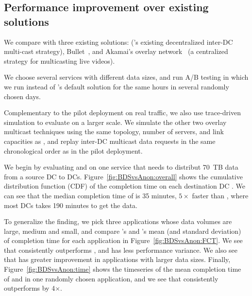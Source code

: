 \subsection{Performance improvement over existing solutions}
\label{subsec:evaluation:centralized}


We compare \name with three existing solutions: \alg (\company's 
existing decentralized inter-DC multi-cast strategy), 
Bullet~\cite{kostic2003bullet}, and Akamai's overlay 
network~\cite{Andreev2013Designing} (a centralized strategy for 
multicasting live videos).


We choose several services with different data sizes, and run 
A/B testing in which we run \name instead of \company's default 
solution \alg for the same hours in several randomly chosen days. 

Complementary to the pilot deployment on real traffic, we also use 
trace-driven simulation to evaluate \name on a larger scale.
We simulate the other two overlay multicast techniques using the 
same topology, number of servers, and link capacities as \name, and 
replay inter-DC multicast data requests in the same chronological
order as in the pilot deployment.

\label{subsubsec:name-vs-alg}

We begin by evaluating \name and \alg on one service that needs to 
distribut 70~TB data from a source DC to  DCs.
Figure~\ref{fig:BDSvsAnon:overall} shows the cumulative distribution 
function (CDF) of the completion time on each destination DC . We can
see that the median completion time of \name is 35 minutes, 
$5\times$ faster than \alg, where most DCs takes 190 minutes to 
get the data.

To generalize the finding, we pick three applications whose data 
volumes are large, medium and small, and compare \name's and \alg's 
mean (and standard deviation) of completion time for each application 
in Figure~\ref{fig:BDSvsAnon:FCT}.
We see that \name consistently outperforms \alg, and has less 
performance variance. We also see that \name has greater improvement 
in applications with larger data sizes. Finally, 
Figure~\ref{fig:BDSvsAnon:time} shows the timeseries of the mean 
completion time of \name and \alg in one randomly chosen application,
and we see that \name consistently outperforms \alg by 4$\times$.

